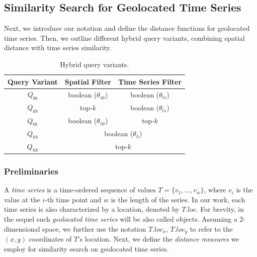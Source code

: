 \subsection{Similarity Search for Geolocated Time Series}
\label{sec:problem}

Next, we introduce our notation and define the distance functions for geolocated time series. Then, we outline different hybrid query variants, combining spatial distance with time series similarity.

\begin{table}[!t]
 \centering
 \caption{Hybrid query variants.}
 \vspace{-10pt}
 \begin{tabular}{c c c}
  \toprule
  Query Variant & Spatial Filter & Time Series Filter \\
  \midrule
  $Q_{bb}$ & boolean ($\theta_{sp}$) & boolean ($\theta_{ts}$) \\
  $Q_{kb}$ & top-$k$ & boolean ($\theta_{ts}$) \\
  $Q_{bk}$ & boolean ($\theta_{sp}$) & top-$k$ \\
  $Q_{hb}$ & \multicolumn{2}{c}{boolean ($\theta_{h}$)} \\
  $Q_{hk}$ & \multicolumn{2}{c}{top-$k$} \\
  \bottomrule
 \end{tabular}
 \label{tab:query_types}
\end{table}




\subsubsection{Preliminaries}
\label{subsec:preliminaries}
A {\em time series} is a time-ordered sequence of values $T = \{v_1, \ldots, v_w\}$, where $v_i$ is the value at the $i$-th time point and $w$ is the length of the series. In our work, each time series is also characterized by a location, denoted by $T.loc$. For brevity, in the sequel such {\em geolocated time series} will be also called objects. Assuming a 2-dimensional space, we further use the notation $T.loc_x$, $T.loc_y$ to refer to the $(x,y)$ coordinates of $T$'s location. Next, we define the {\em distance measures} we employ for similarity search on geolocated time series.

